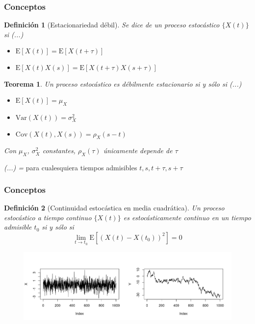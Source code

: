 \documentclass{beamer}
\newtheorem{defn}{Definici\'on}
\newtheorem{thrm}{Teorema}
\newcommand{\E}[1]{\mathrm{E}\left[ #1 \right]}
\newcommand{\Var}[1]{\mathrm{Var}\left( #1 \right)}
\newcommand{\Cov}[1]{\mathrm{Cov}\left( #1 \right)}
\begin{document}
\begin{frame}\frametitle{Conceptos}
{\small
\begin{defn}[Estacionariedad d\'ebil]
Se dice de un proceso estoc\'astico $\{ X(t) \}$ si (...)
\begin{itemize}
\item $\E{X(t)} = \E{X(t+\tau)}$
\item $\E{X(t)X(s)} = \E{X(t+\tau)X(s+\tau)}$
\end{itemize}
\end{defn}

\begin{thrm}
Un proceso estoc\'astico es d\'ebilmente estacionario si y s\'olo si (...)
\begin{itemize}
\item $\E{X(t)} = \mu_X$
\item $\Var{X(t)} = \sigma^{2}_X$
\item $\Cov{X(t),X(s)} = \rho_X (s-t)$
\end{itemize}
Con $\mu_X$, $\sigma^{2}_X$ constantes, $\rho_X(\tau)$ \'unicamente depende de $\tau$
\end{thrm}

\emph{(...) = } para cualesquiera tiempos admisibles $t, s, t+\tau, s+\tau$
}
\end{frame}


\begin{frame}\frametitle{Conceptos}
\begin{defn}[Continuidad estoc\'astica en media cuadr\'atica]
Un proceso estoc\'astico a tiempo continuo $\{ X(t) \}$ es estoc\'asticamente continuo
en un tiempo admisible $t_0$ si y s\'olo si
\begin{equation*}
\lim_{t \rightarrow t_0} \E{\left( X\left(t\right) - X\left(t_0\right) \right)^{2}} = 0
\end{equation*}
\end{defn}

\begin{figure}
\includegraphics[width=.92\linewidth]{ehemplitos_ruido.png}
\end{figure}
\end{frame}
\end{document}
